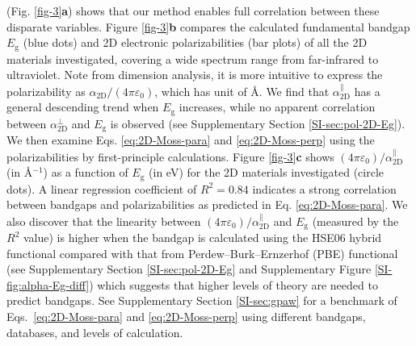 \documentclass[journal=ancac3,manuscript=article,email=true,hyperref=true,keywords=false]{achemso}
\begin{document}
(Fig. \ref{fig-3}{\textbf a}) shows that our method enables full
correlation between these disparate variables.  Figure
\ref{fig-3}{\textbf b} compares the calculated fundamental bandgap
$E_{\mathrm{g}}$ (blue dots) and 2D electronic polarizabilities (bar
plots) of all the 2D materials investigated, covering a wide spectrum
range from far-infrared to ultraviolet.  Note from dimension analysis,
it is more intuitive to express the polarizability as
$\alpha_{\mathrm{2D}}/(4 \pi \varepsilon_{0})$, which has unit of
\AA. We find that $\alpha_{\mathrm{2D}}^{\parallel}$ has a general
descending trend when $E_{\mathrm{g}}$ increases, while no apparent
correlation between $\alpha_{\mathrm{2D}}^{\perp}$ and
$E_{\mathrm{g}}$ is observed (see Supplementary Section
\ref{SI-sec:pol-2D-Eg}).  We then examine Eqs. \ref{eq:2D-Moss-para}
and \ref{eq:2D-Moss-perp} using the polarizabilities by
first-principle calculations.  Figure \ref{fig-3}{\textbf c} shows
$(4 \pi \varepsilon_{0})/\alpha_{\mathrm{2D}}^{\parallel}$ (in
\AA{}$^{-1}$) as a function of $E_{\mathrm{g}}$ (in eV) for the 2D
materials investigated (circle dots).  A linear regression coefficient
of $R^{2}=0.84$ indicates a strong correlation between bandgaps and
polarizabilities as predicted in Eq. \ref{eq:2D-Moss-para}.  We also
discover that the linearity between
$(4 \pi \varepsilon_{0})/\alpha_{\mathrm{2D}}^{\parallel}$ and
$E_{\mathrm{g}}$ (measured by the $R^{2}$ value) is higher when the
bandgap is calculated using the HSE06 hybrid
functional\cite{Heyd_2005} compared with that from
Perdew--Burk--Ernzerhof (PBE)
functional%
(see Supplementary Section \ref{SI-sec:pol-2D-Eg} and Supplementary
Figure \ref{SI-fig:alpha-Eg-diff}) which suggests that higher levels
of theory are needed to predict bandgaps. See Supplementary Section
\ref{SI-sec:gpaw} for a benchmark of Eqs.~\ref{eq:2D-Moss-para} and
\ref{eq:2D-Moss-perp} using different bandgaps, databases, and levels
of calculation.
\end{document}

